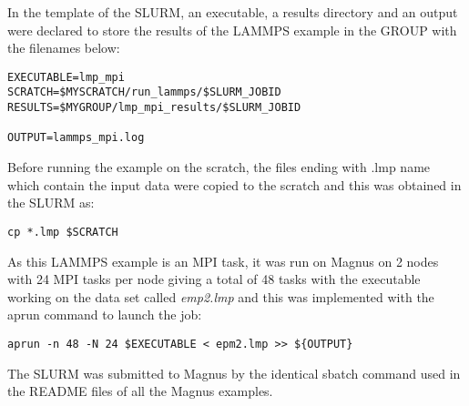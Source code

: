 In the template of the SLURM, an executable, a results directory and an output were declared to store the results of the LAMMPS example in the GROUP 
with the filenames below:

\begin{tcolorbox}
\begin{Verbatim}[fontsize=\scriptsize]
EXECUTABLE=lmp_mpi
SCRATCH=$MYSCRATCH/run_lammps/$SLURM_JOBID
RESULTS=$MYGROUP/lmp_mpi_results/$SLURM_JOBID

OUTPUT=lammps_mpi.log
\end{Verbatim}
\end{tcolorbox}

Before running the example on the scratch, the files ending with .lmp name which contain the input data were copied to the scratch and this was
obtained in the SLURM as:

\begin{tcolorbox}
\begin{Verbatim}[fontsize=\scriptsize]
cp *.lmp $SCRATCH
\end{Verbatim}
\end{tcolorbox}

As this LAMMPS example is an MPI task, it was run on Magnus on 2 nodes with 24 MPI tasks per node giving a total of 48 tasks with the executable working
on the data set called \emph{emp2.lmp} and this was implemented with the aprun command to launch the job:

\begin{tcolorbox}
\begin{Verbatim}[fontsize=\scriptsize]
aprun -n 48 -N 24 $EXECUTABLE < epm2.lmp >> ${OUTPUT}
\end{Verbatim}
\end{tcolorbox}

The SLURM was submitted to Magnus by the identical sbatch command used in the README files of all the Magnus examples.

